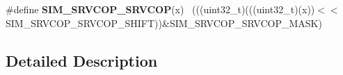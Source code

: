 \begin{DoxyCompactItemize}
\item 
\hypertarget{group___s_i_m___register___masks_gad5b6d6707062ad8a9ba0c1a44a21ade9}{}\#define {\bfseries S\+I\+M\+\_\+\+S\+R\+V\+C\+O\+P\+\_\+\+S\+R\+V\+C\+O\+P}(x)                                      ~(((uint32\+\_\+t)(((uint32\+\_\+t)(x))$<$$<$S\+I\+M\+\_\+\+S\+R\+V\+C\+O\+P\+\_\+\+S\+R\+V\+C\+O\+P\+\_\+\+S\+H\+I\+F\+T))\&S\+I\+M\+\_\+\+S\+R\+V\+C\+O\+P\+\_\+\+S\+R\+V\+C\+O\+P\+\_\+\+M\+A\+S\+K)\label{group___s_i_m___register___masks_gad5b6d6707062ad8a9ba0c1a44a21ade9}

\end{DoxyCompactItemize}


\subsection{Detailed Description}
